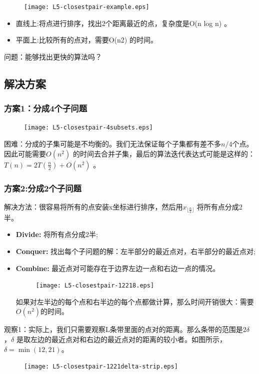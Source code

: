 \begin{figure}[H]
\centering
 \texttt{[image: L5-closestpair-example.eps]}
\end{figure}
\begin{itemize}
 \item 
	直线上:将点进行排序，找出2个距离最近的点，复杂度是O(n log n) 。
\item
	平面上:比较所有的点对，需要O(n2) 的时间。
\end{itemize}
	问题：能够找出更快的算法吗？
\subsection{解决方案}
\subsubsection{方案1：分成4个子问题}
\begin{figure}[H]
\centering
 \texttt{[image: L5-closestpair-4subsets.eps]}
\end{figure}
	
	困难：分成的子集可能是不均衡的。我们无法保证每个子集都有差不多$ n/4 $个点。因此可能需要$O(n^2)$ 的时间去合并子集，最后的算法迭代表达式可能是这样的： $T(n) = 2 T(\frac{n}{2}) + O(n^{2})$ 。
	
\subsubsection{方案2:分成2个子问题}
	
	解决方法：很容易将所有的点安装x坐标进行排序，然后用$x_{ \lfloor \frac{n}{2} \rfloor }$ 将所有点分成2半。
\begin{itemize}
\item  {\bf Divide: }将所有点分成2半; 
\item  {\bf Conquer: }找出每个子问题的解：左半部分的最近点对，右半部分的最近点对; 
\item  {\bf Combine: }最近点对可能存在于边界左边一点和右边一点的情况。

\begin{figure}[H]
\centering
 \texttt{[image: L5-closestpair-12218.eps]}
\end{figure}
	如果对左半边的每个点和右半边的每个点都做计算，那么时间开销很大：需要$O(n^2)$的时间。
\end{itemize}

	观察1：实际上，我们只需要观察L条带里面的点对的距离。那么条带的范围是$2\delta$，$\delta$ 
是取左边的最近点对和右边的最近点对的距离的较小者。如图所示，$\delta = \min(12,21)$。
\begin{figure}[H]
\centering
 \texttt{[image: L5-closestpair-1221delta-strip.eps]}
\end{figure}

